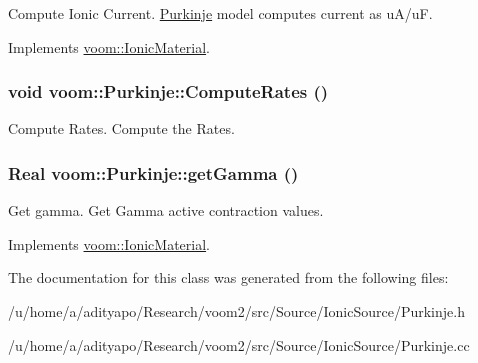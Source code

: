 Compute Ionic Current. \hyperlink{classvoom_1_1_purkinje}{Purkinje} model computes current as uA/uF. 

Implements \hyperlink{classvoom_1_1_ionic_material_a1b95cf90af115374b428f2e5ece571cb}{voom::IonicMaterial}.\hypertarget{classvoom_1_1_purkinje_aaa3d5d9632eaca5099d0568227faa958}{
\subsubsection[{ComputeRates}]{\setlength{\rightskip}{0pt plus 5cm}void voom::Purkinje::ComputeRates ()}}
\label{classvoom_1_1_purkinje_aaa3d5d9632eaca5099d0568227faa958}


Compute Rates. Compute the Rates. \hypertarget{classvoom_1_1_purkinje_a337aa8f4b1ea0bd6f08635950cc39a2d}{
\subsubsection[{getGamma}]{\setlength{\rightskip}{0pt plus 5cm}Real voom::Purkinje::getGamma ()}}
\label{classvoom_1_1_purkinje_a337aa8f4b1ea0bd6f08635950cc39a2d}


Get gamma. Get Gamma active contraction values. 

Implements \hyperlink{classvoom_1_1_ionic_material_a98f1fa5bc5fa9ff6abfcd302111f8eac}{voom::IonicMaterial}.

The documentation for this class was generated from the following files:\begin{DoxyCompactItemize}
\item 
/u/home/a/adityapo/Research/voom2/src/Source/IonicSource/Purkinje.h\item 
/u/home/a/adityapo/Research/voom2/src/Source/IonicSource/Purkinje.cc\end{DoxyCompactItemize}

